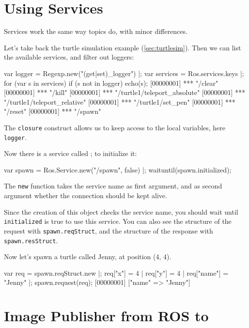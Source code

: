 \section{Using Services}

Services work the same way topics do, with minor differences.

Let's take back the turtle simulation example (\autoref{sec:turtlesim}).
Then we can list the available services, and filter out loggers:

\begin{urbiunchecked}
var logger = Regexp.new("(get|set)_logger") |;
var services = Ros.services.keys |;
for (var s in services)
  if (s not in logger)
    echo(s);
[00000001] *** "/clear"
[00000001] *** "/kill"
[00000001] *** "/turtle1/teleport_absolute"
[00000001] *** "/turtle1/teleport_relative"
[00000001] *** "/turtle1/set_pen"
[00000001] *** "/reset"
[00000001] *** "/spawn"
\end{urbiunchecked}

The \lstinline{closure} construct allows us to keep access to the local
variables, here \lstinline{logger}.

Now there is a service called ; to initialize it:

\begin{urbiunchecked}
var spawn = Ros.Service.new("/spawn", false) |;
waituntil(spawn.initialized);
\end{urbiunchecked}

The \lstinline{new} function takes the service name as first argument, and
as second argument whether the connection should be kept alive.

Since the creation of this object checks the service name, you should wait
until \lstinline{initialized} is true to use this service.  You can also see
the structure of the request with \lstinline{spawn.reqStruct}, and the
structure of the response with \lstinline{spawn.resStruct}.

Now let's spawn a turtle called Jenny, at position (4, 4).

\begin{urbiunchecked}
var req = spawn.reqStruct.new |;
req["x"] = 4 |
req["y"] = 4 |
req["name"] = "Jenny" |;
spawn.request(req);
[00000001] ["name" => "Jenny"]
\end{urbiunchecked}

\section{Image Publisher from ROS to \urbi}

